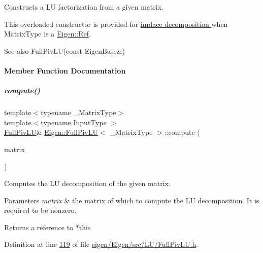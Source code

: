 Constructs a LU factorization from a given matrix. 

This overloaded constructor is provided for \hyperlink{group___inplace_decomposition}{inplace decomposition } when {\ttfamily Matrix\+Type} is a \hyperlink{group___core___module_class_eigen_1_1_ref}{Eigen\+::\+Ref}.

\begin{DoxySeeAlso}{See also}
Full\+Piv\+L\+U(const Eigen\+Base\&) 
\end{DoxySeeAlso}


\paragraph{Member Function Documentation}
\mbox{\label{group___l_u___module_a0a3c3b1bbafa31a03567a4573ebabc79}} 
\subparagraph{\texorpdfstring{compute()}{compute()}\hspace{0.1cm}{\footnotesize\ttfamily [1/2]}}
{\footnotesize\ttfamily template$<$typename \+\_\+\+Matrix\+Type$>$ \\
template$<$typename Input\+Type $>$ \\
\hyperlink{group___l_u___module_class_eigen_1_1_full_piv_l_u}{Full\+Piv\+LU}\& \hyperlink{group___l_u___module_class_eigen_1_1_full_piv_l_u}{Eigen\+::\+Full\+Piv\+LU}$<$ \+\_\+\+Matrix\+Type $>$\+::compute (\begin{DoxyParamCaption}\item[{const \hyperlink{group___core___module_struct_eigen_1_1_eigen_base}{Eigen\+Base}$<$ Input\+Type $>$ \&}]{matrix }\end{DoxyParamCaption})\hspace{0.3cm}{\ttfamily [inline]}}

Computes the LU decomposition of the given matrix.


\begin{DoxyParams}{Parameters}
{\em matrix} & the matrix of which to compute the LU decomposition. It is required to be nonzero.\\
\hline
\end{DoxyParams}
\begin{DoxyReturn}{Returns}
a reference to $\ast$this 
\end{DoxyReturn}


Definition at line \hyperlink{eigen_2_eigen_2src_2_l_u_2_full_piv_l_u_8h_source_l00119}{119} of file \hyperlink{eigen_2_eigen_2src_2_l_u_2_full_piv_l_u_8h_source}{eigen/\+Eigen/src/\+L\+U/\+Full\+Piv\+L\+U.\+h}.


